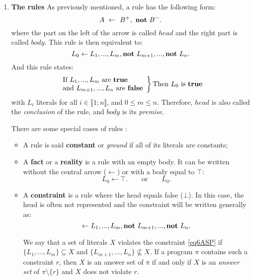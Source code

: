 \begin{enumerate}
\item \textbf{The rules}
As previously mentioned, a rule has the following form:
\begin{equation} \label{eq3ASP}
A ~ \leftarrow ~ B^+, ~ \textbf{not}~ B^-.
\end{equation}
where the part on the left of the arrow is called $head$
and the right part is called $body$.
This rule is then equivalent to:
\begin{equation} \label{eq2ASP}
L_{0} \leftarrow L_{1},...,L_{m}, \textbf{not}~ L_{m+1},..., \textbf{not}~ L_{n}.
\end{equation}
And this rule states:
\[
\left.
    \begin{array}{ll}
        \text{If} ~ L_{1},...,L_{m} ~ \text{are \textbf{true}}\\
        \text{and} ~ L_{m+1},...,L_{n} ~ \text{are \textbf{false}}
    \end{array}
\right \} \text{Then} ~ L_{0} ~ \text{is } \textbf{true} 
\]
with $L_{i}$ literals for all $i \in \llbracket 1 ; n \rrbracket$, and $0 \leq m \leq n$.
Therefore, $head$ is also called the \emph{conclusion} of the rule,
and $body$ is its \emph{premise}.

There are some special cases of rules \cite{Vladimir,baral2003knowledge}:
\begin{itemize}
\item A rule is said \textbf{constant} or \emph{ground} if all of its literals are constants;
\item A \textbf{fact} or a \textbf{reality} is a rule with an empty body.
  It can be written without the central arrow ($\leftarrow$) or with a body equal to $\top$:
\begin{equation} 
L_{0} \leftarrow \top. \qquad \text{or} \qquad L_{0}.
 \label{eq5ASP}
\end{equation}

\item A \textbf{constraint} is a rule where the head equals false ($\bot$).
  In this case, the head is often not represented and the constraint will be written generally as:
\begin{equation} 
  \leftarrow L_{1},...,L_{m}, \textbf{not}~ L_{m+1},..., \textbf{not}~ L_{n}.
  \label{eq6ASP}
\end{equation}

We say that a set of literals $X$ violates the constraint \eqref{eq6ASP} if $\{L_{1},...,L_{m}\} \subseteq X$ and $\{L_{m+1},...,L_{n}\} \nsubseteq X$.
If a program $\pi$ contains such a constraint $r$, then $X$ is an answer set of $\pi$ if and only if $X$ is an \textit{answer set} of $\pi \setminus \{r\}$ and $X$ does not violate $r$.


\end{itemize}
\end{enumerate}
